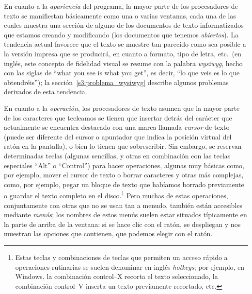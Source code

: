 En cuanto a la \emph{apariencia} del programa, la mayor parte de los procesadores de texto se manifiestan básicamente como una o varias ventanas, cada una de las cuales muestra una sección de alguno de los documentos de texto informatizados que estamos creando y modificando (los documentos que tenemos \emph{abiertos}). La tendencia actual favorece que el texto se muestre tan parecido como sea posible a la versión impresa que se  producirá, en cuanto a formato, tipo de letra, etc.\ (en inglés, este concepto de fidelidad visual se resume con la palabra {\em wysiwyg}, hecho con las siglas de ``what you see is what you get'', es decir, ``lo que veis es lo que obtendréis''); la sección~\ref{s3:problema_wysiwyg} describe algunos problemas derivados de esta tendencia. 

En cuanto a la \emph{operación}, los procesadores de texto asumen que la mayor parte de los caracteres que tecleamos se tienen que insertar detrás del carácter que actualmente se encuentra destacado con una marca llamada {\em cursor} de texto (puede ser diferente del cursor o apuntador que indica la posición virtual del ratón en la pantalla), o bien lo tienen que sobrescribir. Sin embargo, se reservan determinadas teclas (algunas sencillas, y otras en combinación con las teclas especiales ``Alt'' o ``Control'') para hacer operaciones, algunas muy básicas como, por ejemplo, mover el cursor de texto o borrar caracteres y otras más complejas, como, por ejemplo, pegar un bloque de texto que habíamos borrado previamente o guardar el texto completo en el disco.\footnote{Estas teclas y combinaciones de teclas que permiten un acceso rápido a operaciones rutinarias se suelen denominar en inglés \emph{hotkeys}; por ejemplo, en Windows, la combinación control--X recorta el texto seleccionado, la combinación control--V inserta un texto previamente recortado, etc.} Pero muchas de estas operaciones, conjuntamente con otras que no se usan tan a menudo, también están accesibles mediante \emph{menús}; los nombres de estos menús suelen estar situados típicamente en la parte de arriba de la ventana: si se  hace clic con el ratón, se despliegan y nos muestran las opciones que contienen, que podemos elegir con el ratón. 

